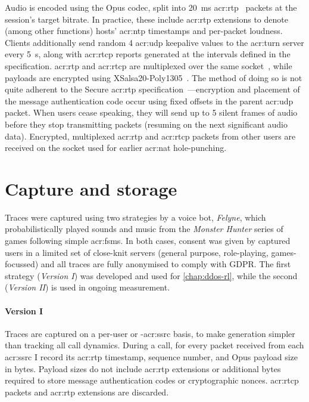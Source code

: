 Audio is encoded using the Opus codec, split into \qty{20}{\milli\second} \gls{acr:rtp}~\parencite{rfc3550} packets at the session's target bitrate.
In practice, these include \gls{acr:rtp} extensions to denote (among other functions) hosts' \gls{acr:ntp} timestamps and per-packet loudness.
Clients additionally send random \qty{4}{\byte} \gls{acr:udp} keepalive values to the \gls{acr:turn} server every \qty{5}{\second}, along with \gls{acr:rtcp} reports generated at the intervals defined in the specification.
\gls{acr:rtp} and \gls{acr:rtcp} are multiplexed over the same socket~\parencite{rfc5761}, while payloads are encrypted using XSalsa20-Poly1305~\parencite{xsalsa20,rfc8439}.
The method of doing so is not quite adherent to the Secure \gls{acr:rtp} specification~\parencite{rfc3711}---encryption and placement of the message authentication code occur using fixed offsets in the parent \gls{acr:udp} packet.
When users cease speaking, they will send up to 5 silent frames of audio before they stop transmitting packets (resuming on the next significant audio data).
Encrypted, multiplexed \gls{acr:rtp} and \gls{acr:rtcp} packets from other users are received on the socket used for earlier \gls{acr:nat} hole-punching.

%

\section{Capture and storage}
Traces were captured using two strategies by a voice bot, \emph{Felyne}, which probabilistically played sounds and music from the \emph{Monster Hunter} series of games following simple \glspl{acr:fsm}.
In both cases, consent was given by captured users in a limited set of close-knit servers (general purpose, role-playing, games-focussed) and all traces are fully anonymised to comply with GDPR.
The first strategy (\emph{Version \RN{1}}) was developed and used for \cref{chap:ddos-rl}, while the second (\emph{Version \RN{2}}) is used in ongoing measurement.

\paragraph{Version \RN{1}}
Traces are captured on a per-user or -\gls{acr:ssrc} basis, to make generation simpler than tracking all call dynamics.
During a call, for every packet received from each \gls{acr:ssrc} I record its \gls{acr:rtp} timestamp, sequence number, and Opus payload size in bytes.
Payload sizes do not include \gls{acr:rtp} extensions or additional bytes required to store message authentication codes or cryptographic nonces.
\gls{acr:rtcp} packets and \gls{acr:rtp} extensions are discarded.

